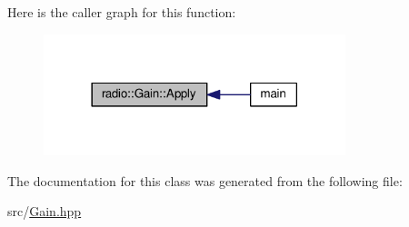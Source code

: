 Here is the caller graph for this function\+:
\nopagebreak
\begin{figure}[H]
\begin{center}
\leavevmode
\includegraphics[width=249pt]{classradio_1_1Gain_a8c6df2c5989da0e560c8f276e6138a2d_icgraph}
\end{center}
\end{figure}




The documentation for this class was generated from the following file\+:\begin{DoxyCompactItemize}
\item 
src/\hyperlink{Gain_8hpp}{Gain.\+hpp}\end{DoxyCompactItemize}
